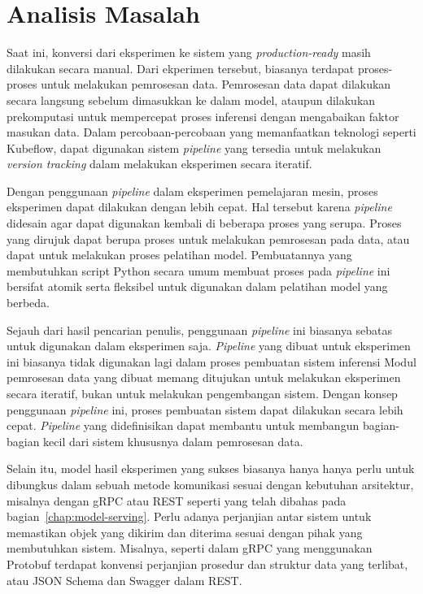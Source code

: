 \section{Analisis Masalah}

Saat ini, konversi dari eksperimen ke sistem yang \textit{production-ready} masih dilakukan secara manual.
Dari ekperimen tersebut, biasanya terdapat proses-proses untuk melakukan pemrosesan data.
Pemrosesan data dapat dilakukan secara langsung sebelum dimasukkan ke dalam model, ataupun dilakukan prekomputasi untuk mempercepat proses inferensi dengan mengabaikan faktor masukan data.
Dalam percobaan-percobaan yang memanfaatkan teknologi seperti Kubeflow, dapat digunakan sistem \textit{pipeline} yang tersedia untuk melakukan \textit{version tracking} dalam melakukan eksperimen secara iteratif.

Dengan penggunaan \textit{pipeline} dalam eksperimen pemelajaran mesin, proses eksperimen dapat dilakukan dengan lebih cepat.
Hal tersebut karena \textit{pipeline} didesain agar dapat digunakan kembali di beberapa proses yang serupa.
Proses yang dirujuk dapat berupa proses untuk melakukan pemrosesan pada data, atau dapat untuk melakukan proses pelatihan model.
Pembuatannya yang membutuhkan script Python secara umum membuat proses pada \textit{pipeline} ini bersifat atomik serta fleksibel untuk digunakan dalam pelatihan model yang berbeda.

Sejauh dari hasil pencarian penulis, penggunaan \textit{pipeline} ini biasanya sebatas  untuk digunakan dalam eksperimen saja.
\textit{Pipeline} yang dibuat untuk eksperimen ini biasanya tidak digunakan lagi dalam proses pembuatan sistem inferensi
Modul pemrosesan data yang dibuat memang ditujukan untuk melakukan eksperimen secara iteratif, bukan untuk melakukan pengembangan sistem.
Dengan konsep penggunaan \textit{pipeline} ini, proses pembuatan sistem dapat dilakukan secara lebih cepat.
\textit{Pipeline} yang didefinisikan dapat membantu untuk membangun bagian-bagian kecil dari sistem khususnya dalam pemrosesan data. 

Selain itu, model hasil eksperimen yang sukses biasanya hanya hanya perlu untuk dibungkus dalam sebuah metode komunikasi sesuai dengan kebutuhan arsitektur, misalnya dengan gRPC atau REST seperti yang telah dibahas pada bagian~\ref{chap:model-serving}.\@
Perlu adanya perjanjian antar sistem untuk memastikan objek yang dikirim dan diterima sesuai dengan pihak yang membutuhkan sistem.
Misalnya, seperti dalam gRPC yang menggunakan Protobuf terdapat konvensi perjanjian prosedur dan struktur data yang terlibat, atau JSON Schema dan Swagger dalam REST.\@
